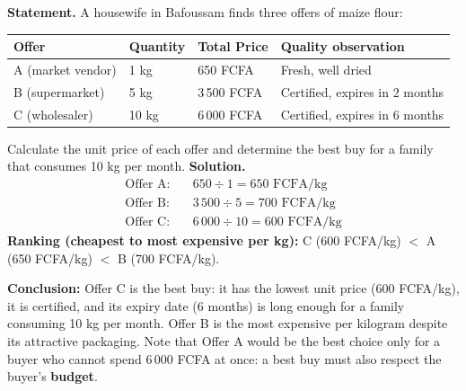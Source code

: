 \documentclass[11pt]{article}
\newcommand{\cle}[1]{{\popxbold\color{popdark}#1}}
\begin{document}
\begin{exoresolu}
\textbf{Statement.} A housewife in Bafoussam finds three offers of maize flour:
\begin{center}
\begin{tabularx}{\linewidth}{|l|X|X|X|}\hline
\rowcolor{popblueL}\textbf{Offer} & \textbf{Quantity} & \textbf{Total Price} & \textbf{Quality observation} \\ \hline
A (market vendor) & 1 kg & 650 FCFA & Fresh, well dried \\ \hline
B (supermarket) & 5 kg & 3\,500 FCFA & Certified, expires in 2 months \\ \hline
C (wholesaler) & 10 kg & 6\,000 FCFA & Certified, expires in 6 months \\ \hline
\end{tabularx}
\end{center}
Calculate the unit price of each offer and determine the \cle{best buy} for a family that consumes 10 kg per month.
\tcblower
\textbf{Solution.}
\begin{align*}
\text{Offer A:} \quad & 650 \div 1 = 650 \text{ FCFA/kg}\\
\text{Offer B:} \quad & 3\,500 \div 5 = 700 \text{ FCFA/kg}\\
\text{Offer C:} \quad & 6\,000 \div 10 = 600 \text{ FCFA/kg}
\end{align*}
\textbf{Ranking (cheapest to most expensive per kg):} C (600 FCFA/kg) $<$ A (650 FCFA/kg) $<$ B (700 FCFA/kg).

\textbf{Conclusion:} Offer C is the \cle{best buy}: it has the lowest \cle{unit price} (600 FCFA/kg), it is certified, and its \cle{expiry date} (6 months) is long enough for a family consuming 10 kg per month. Offer B is the most expensive per kilogram despite its attractive packaging. Note that Offer A would be the best choice only for a buyer who cannot spend 6\,000 FCFA at once: a \cle{best buy} must also respect the buyer's \textbf{budget}.
\end{exoresolu}
\end{document}
